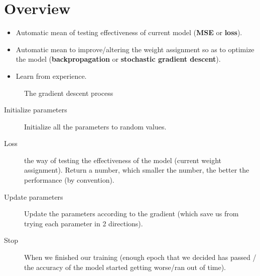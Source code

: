\documentclass{article}
\begin{document}
\section{Overview}

\begin{itemize}
    \item Automatic mean of testing effectiveness of current model (\textbf{MSE} or
          \textbf{loss}).
    \item Automatic mean to improve/altering the weight assignment so as to
          optimize the model (\textbf{backpropagation} or \textbf{stochastic gradient descent}).
    \item Learn from experience.
\end{itemize}

\begin{figure}[htb]
    \centering
    \caption{The gradient descent process}
    \label{fig:gradient_descent}
\end{figure}

\begin{description}
    \item[Initialize parameters] Initialize all the parameters to random values.
    \item[Loss] the way of testing the effectiveness of the model (current weight
        assignment). Return a number, which smaller the number, the better the performance
        (by convention).
    \item[Update parameters] Update the parameters according to the gradient (which
        save us from trying each parameter in 2 directions).
    \item[Stop] When we finished our training (enough epoch that we decided has
        passed / the accuracy of the model started getting worse/ran out of time).
\end{description}
\end{document}
